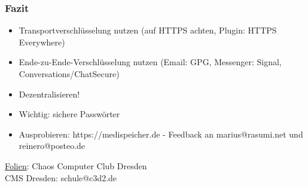 \begin{frame}
  \frametitle{Fazit}
  \begin{center}
    \begin{itemize}
      \item Transportverschlüsselung nutzen (auf HTTPS achten, Plugin: HTTPS Everywhere)
      \item Ende-zu-Ende-Verschlüsselung nutzen (Email: GPG, Messenger: Signal, Conversations/ChatSecure)
      \item Dezentralisieren!
      \item Wichtig: sichere Passwörter
      \item Ausprobieren: https://medispeicher.de - Feedback an marius@rasumi.net und reinero@posteo.de
    \end{itemize}

    \vspace{5mm}
    \href{https://github.com/cms/2016_05_04_kleinzschachwitz/}{Folien}: \href{https://creativecommons.org/licenses/by-sa/4.0/}{} Chaos Computer Club Dresden \\
    \vspace{3mm}
    CMS Dresden: schule@c3d2.de
  \end{center}
\end{frame}
